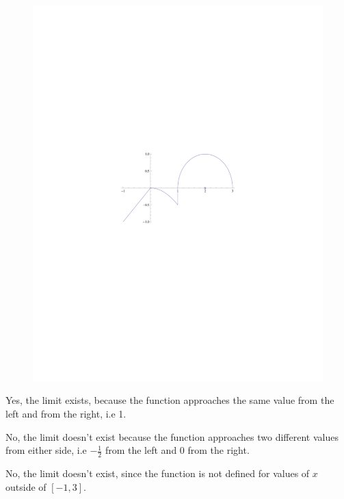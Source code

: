 \documentclass{hwset}
\begin{document}
\be
	\item \begin{solution}
	\begin{figure}[H]
	\begin{center}
		\includegraphics[trim=200 300 280 290]{HW1_1.pdf} \\
	\end{center}
	\end{figure}
	\end{solution}
	\item \begin{solution}
		Yes, the limit exists, because the function approaches the same value from
		the left and from the right, i.e 1.
	\end{solution}
	\item \begin{solution}
		No, the limit doesn't exist because the function approaches two different
		values from either side, i.e $-\frac{1}{2}$ from the left and $0$ from the
		right.
	\end{solution}
	\item \begin{solution}
		No, the limit doesn't exist, since the function is not defined for values of
		$x$ outside of $[-1, 3].$
	\end{solution}
\ee
\end{document}
